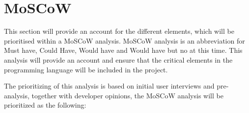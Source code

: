 \section{MoSCoW}


This section will provide an account for the different elements, which will be prioritised within a MoSCoW analysis. MoSCoW analysis is an abbreviation for Must have, Could Have, Would have and Would have but no at this time. This analysis will provide an account and ensure that the critical elements in the programming language will be included in the project. 

The prioritizing of this analysis is based on initial user interviews and pre-analysis, together with developer opinions, the MoSCoW analysis will be prioritized as the following:\\  


